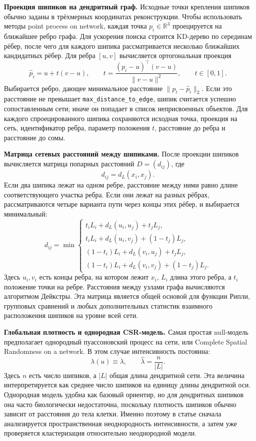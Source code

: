 \documentclass[12pt,a4paper]{article}
\begin{document}
\noindent\textbf{Проекция шипиков на дендритный граф.}
Исходные точки крепления шипиков обычно заданы в трёхмерных координатах реконструкции. Чтобы использовать методы point process on network, каждая точка \(p_i\in\mathbb{R}^3\) проецируется на ближайшее ребро графа. Для ускорения поиска строится KD-дерево по серединам рёбер, после чего для каждого шипика рассматривается несколько ближайших кандидатных рёбер. Для ребра \([u,v]\) вычисляется ортогональная проекция
\[
\hat p_i = u + t(v-u), \qquad
t=\frac{(p_i-u)^\top(v-u)}{\|v-u\|^2}, \qquad t\in[0,1].
\]
Выбирается ребро, дающее минимальное расстояние \(\|p_i-\hat p_i\|_2\). Если это расстояние не превышает \texttt{max\_distance\_to\_edge}, шипик считается успешно сопоставленным сети; иначе он попадает в список неприсвоенных объектов. Для каждого спроецированного шипика сохраняются исходная точка, проекция на сеть, идентификатор ребра, параметр положения \(t\), расстояние до ребра и расстояние до сомы.

\noindent\textbf{Матрица сетевых расстояний между шипиками.}
После проекции шипиков вычисляется матрица попарных расстояний \(D=(d_{ij})\), где
\[
d_{ij}=d_L(x_i,x_j).
\]
Если два шипика лежат на одном ребре, расстояние между ними равно длине соответствующего участка ребра. Если они лежат на разных рёбрах, рассматриваются четыре варианта пути через концы этих рёбер, и выбирается минимальный:
\[
d_{ij}=\min
\begin{cases}
t_iL_i+d_L(u_i,u_j)+t_jL_j,\\
t_iL_i+d_L(u_i,v_j)+(1-t_j)L_j,\\
(1-t_i)L_i+d_L(v_i,u_j)+t_jL_j,\\
(1-t_i)L_i+d_L(v_i,v_j)+(1-t_j)L_j.
\end{cases}
\]
Здесь \(u_i,v_i\) есть концы ребра, на котором лежит \(x_i\), \(L_i\) длина этого ребра, а \(t_i\) положение точки на ребре. Расстояния между узлами графа вычисляются алгоритмом Дейкстры. Эта матрица является общей основой для функции Рипли, групповых сравнений и любых дополнительных статистик взаимного расположения шипиков на уровне всей сети.

\noindent\textbf{Глобальная плотность и однородная CSR-модель.}
Самая простая null-модель предполагает однородный пуассоновский процесс на сети, или Complete Spatial Randomness on a network. В этом случае интенсивность постоянна:
\[
\lambda(u)\equiv \lambda,
\qquad
\hat\lambda=\frac{n}{|L|}.
\]
Здесь \(n\) есть число шипиков, а \(|L|\) общая длина дендритной сети. Эта величина интерпретируется как среднее число шипиков на единицу длины дендритной оси. Однородная модель удобна как базовый ориентир, но для дендритных шипиков она часто биологически недостаточна, поскольку плотность шипиков обычно зависит от расстояния до тела клетки. Именно поэтому в статье сначала анализируется пространственная неоднородность интенсивности, а затем уже проверяется кластеризация относительно неоднородной модели.
\end{document}
